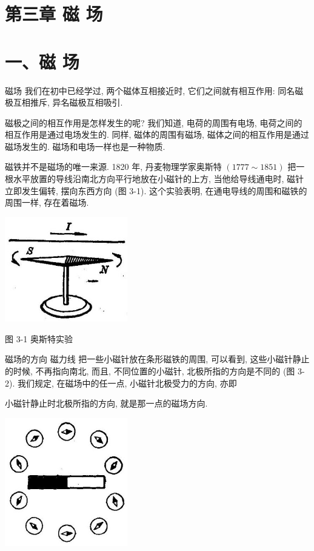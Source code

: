 \documentclass[10pt]{article}
\begin{document}
\section*{第三章 磁 场}

\section*{一、磁 场}

磁场 我们在初中已经学过, 两个磁体互相接近时, 它们之间就有相互作用: 同名磁极互相推斥, 异名磁极互相吸引.

磁极之间的相互作用是怎样发生的呢? 我们知道, 电荷的周围有电场, 电荷之间的相互作用是通过电场发生的. 同样, 磁体的周围有磁场, 磁体之间的相互作用是通过磁场发生的. 磁场和电场一样也是一种物质.

磁铁并不是磁场的唯一来源. 1820 年, 丹麦物理学家奥斯特 \(\left( {{1777} \sim {1851}}\right)\) 把一根水平放置的导线沿南北方向平行地放在小磁针的上方, 当他给导线通电时, 磁针立即发生偏转, 摆向东西方向 (图 3-1). 这个实验表明, 在通电导线的周围和磁铁的周围一样, 存在着磁场.

\begin{center}
\includegraphics[max width=0.4\textwidth]{images/01913056-1f15-74d8-9184-9aab52c9d66b_103_876404.jpg}
\end{center}

图 3-1 奥斯特实验

磁场的方向 磁力线 把一些小磁针放在条形磁铁的周围, 可以看到, 这些小磁针静止的时候, 不再指向南北, 而且, 不同位置的小磁针, 北极所指的方向是不同的 (图 3-2). 我们规定, 在磁场中的任一点, 小磁针北极受力的方向, 亦即

小磁针静止时北极所指的方向, 就是那一点的磁场方向.

\begin{center}
\includegraphics[max width=0.4\textwidth]{images/01913056-1f15-74d8-9184-9aab52c9d66b_104_343500.jpg}
\end{center}
\end{document}
